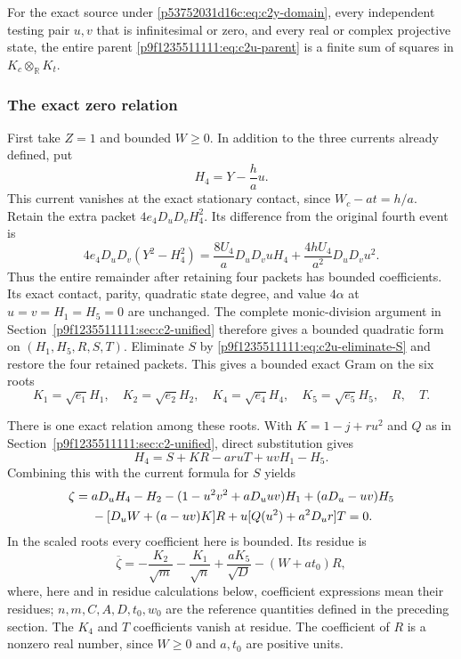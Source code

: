 \begin{theorem}
\label{p53752031d16c:thm:c2-y-current}
For the exact source under \eqref{p53752031d16c:eq:c2y-domain}, every independent
testing pair $u,v$ that is infinitesimal or zero, and every real or
complex projective state, the entire parent \eqref{p9f1235511111:eq:c2u-parent} is a
finite sum of squares in $K_c\otimes_{\mathbb R}K_t$.
\end{theorem}

\subsubsection*{The exact zero relation}
First take $Z=1$ and bounded $W\geq0$.  In addition to the three currents
already defined, put
\[
H_4=Y-\frac ha u.
\]
This current vanishes at the exact stationary contact, since
$W_c-at=h/a$.  Retain the extra packet $4e_4D_uD_vH_4^2$.
Its difference from the original fourth event is
\[
4e_4D_uD_v(Y^2-H_4^2)
=\frac{8U_4}{a}D_uD_vuH_4+
\frac{4hU_4}{a^2}D_uD_vu^2.
\]
Thus the entire remainder after retaining four packets has bounded
coefficients.  Its exact contact, parity, quadratic state degree, and
value $4\alpha$ at $u=v=H_1=H_5=0$ are unchanged.  The complete
monic-division argument in Section~\ref{p9f1235511111:sec:c2-unified} therefore gives
a bounded quadratic form on $(H_1,H_5,R,S,T)$.  Eliminate $S$ by
\eqref{p9f1235511111:eq:c2u-eliminate-S} and restore the four retained packets.  This
gives a bounded exact Gram on the six roots
\begin{equation}
K_1=\sqrt{e_1}H_1,\quad K_2=\sqrt{e_2}H_2,\quad
K_4=\sqrt{e_4}H_4,\quad K_5=\sqrt{e_5}H_5,\quad R,\quad T.
\label{p53752031d16c:eq:c2y-roots}
\end{equation}

There is one exact relation among these roots.  With
$K=1-j+ru^2$ and $Q$ as in Section~\ref{p9f1235511111:sec:c2-unified}, direct
substitution gives
\[
H_4=S+KR-ar uT+uvH_1-H_5.
\]
Combining this with the current formula for $S$ yields
\begin{align}
\zeta={}&aD_uH_4-H_2-(1-u^2v^2+aD_uuv)H_1
 +(aD_u-uv)H_5\notag\\
&-[D_uW+(a-uv)K]R+u[Q(u^2)+a^2D_ur]T=0.
\label{p53752031d16c:eq:c2y-zero-relation}
\end{align}
In the scaled roots every coefficient here is bounded.  Its residue is
\begin{equation}
\overline\zeta=-\frac{K_2}{\sqrt m}-\frac{K_1}{\sqrt n}
+\frac{aK_5}{\sqrt D}-(W+at_0)R,
\label{p53752031d16c:eq:c2y-zero-residue}
\end{equation}
where, here and in residue calculations below, coefficient expressions
mean their residues; $n,m,C,A,D,t_0,w_0$ are the reference quantities
defined in the preceding section.  The $K_4$ and $T$ coefficients
vanish at residue.  The coefficient of $R$ is a nonzero real number,
since $W\geq0$ and $a,t_0$ are positive units.

